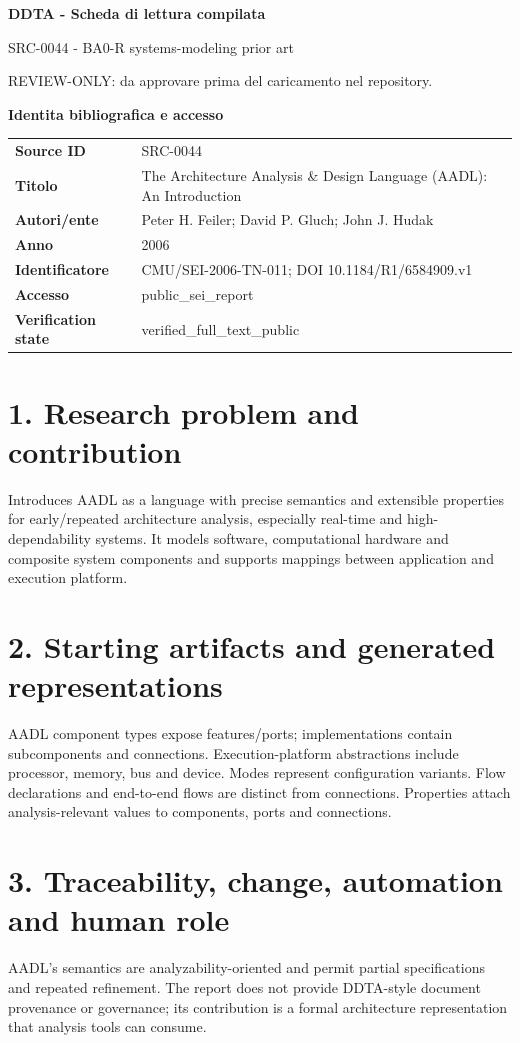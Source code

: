 \documentclass[10pt,a4paper]{article}
\newenvironment{factbox}[1]{\def\FrameCommand{\fcolorbox{ddtablue}{ddtagray}}\MakeFramed{\advance\hsize-2\width\FrameRestore}\noindent\textbf{#1}\par\smallskip}{\endMakeFramed}
\begin{document}
\begin{center}
{\LARGE\bfseries DDTA - Scheda di lettura compilata}\par
{\large SRC-0044 - BA0-R systems-modeling prior art}\par
{\small REVIEW-ONLY: da approvare prima del caricamento nel repository.}\par
\end{center}
\begin{factbox}{Identita bibliografica e accesso}
\begin{tabularx}{\linewidth}{>{\bfseries}p{3.4cm}X}
Source ID & SRC-0044\\
Titolo & The Architecture Analysis \& Design Language (AADL): An Introduction\\
Autori/ente & Peter H. Feiler; David P. Gluch; John J. Hudak\\
Anno & 2006\\
Identificatore & CMU/SEI-2006-TN-011; DOI 10.1184/R1/6584909.v1\\
Accesso & public\_sei\_report\\
Verification state & verified\_full\_text\_public\\
\end{tabularx}
\end{factbox}
\section{1. Research problem and contribution}
Introduces AADL as a language with precise semantics and extensible properties for early/repeated architecture analysis, especially real-time and high-dependability systems. It models software, computational hardware and composite system components and supports mappings between application and execution platform.
\section{2. Starting artifacts and generated representations}
AADL component types expose features/ports; implementations contain subcomponents and connections. Execution-platform abstractions include processor, memory, bus and device. Modes represent configuration variants. Flow declarations and end-to-end flows are distinct from connections. Properties attach analysis-relevant values to components, ports and connections.
\section{3. Traceability, change, automation and human role}
AADL’s semantics are analyzability-oriented and permit partial specifications and repeated refinement. The report does not provide DDTA-style document provenance or governance; its contribution is a formal architecture representation that analysis tools can consume.
\end{document}
